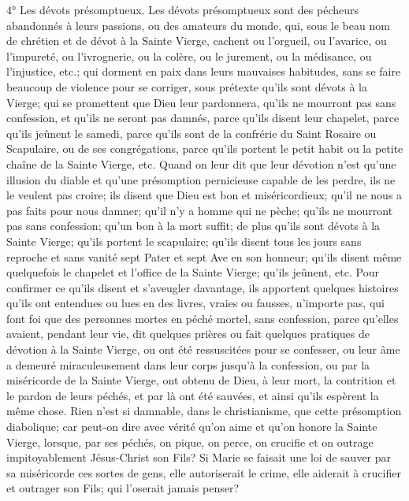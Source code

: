 4° Les dévots présomptueux.
 Les dévots présomptueux sont des pécheurs abandonnés à leurs passions, ou des amateurs du monde, qui,
sous le beau nom de chrétien et de dévot à la Sainte Vierge, cachent ou l'orgueil, ou l'avarice, ou l'impureté, ou
l'ivrognerie, ou la colère, ou le jurement, ou la médisance, ou l'injustice, etc.; qui dorment en paix dans leurs
mauvaises habitudes, sans se faire beaucoup de violence pour se corriger, sous prétexte qu'ils sont dévots à la
Vierge; qui se promettent que Dieu leur pardonnera, qu'ils ne mourront pas sans confession, et qu'ils ne seront pas
damnés, parce qu'ils disent leur chapelet, parce qu'ils jeûnent le samedi, parce qu'ils sont de la confrérie du Saint
Rosaire ou Scapulaire, ou de ses congrégations, parce qu'ils portent le petit habit ou la petite chaîne de la Sainte
Vierge, etc.
Quand on leur dit que leur dévotion n'est qu'une illusion du diable et qu'une présomption pernicieuse capable de
les perdre, ils ne le veulent pas croire; ils disent que Dieu est bon et miséricordieux; qu'il ne nous a pas faits pour
nous damner; qu'il n'y a homme qui ne pèche; qu'ils ne mourront pas sans confession; qu'un bon  à la mort
suffit; de plus qu'ils sont dévots à la Sainte Vierge; qu'ils portent le scapulaire; qu'ils disent tous les jours sans
reproche et sans vanité sept Pater et sept Ave en son honneur; qu'ils disent même quelquefois le chapelet et
l'office de la Sainte Vierge; qu'ils jeûnent, etc. Pour confirmer ce qu'ils disent et s'aveugler davantage, ils apportent
quelques histoires qu'ils ont entendues ou lues en des livres, vraies ou fausses, n'importe pas, qui font foi que des
personnes mortes en péché mortel, sans confession, parce qu'elles avaient, pendant leur vie, dit quelques prières
ou fait quelques pratiques de dévotion à la Sainte Vierge, ou ont été ressuscitées pour se confesser, ou leur âme a
demeuré miraculeusement dans leur corps jusqu'à la confession, ou par la miséricorde de la Sainte Vierge, ont
obtenu de Dieu, à leur mort, la contrition et le pardon de leurs péchés, et par là ont été sauvées, et ainsi qu'ils
espèrent la même chose.
 Rien n'est si damnable, dans le christianisme, que cette présomption diabolique; car peut-on dire avec vérité
qu'on aime et qu'on honore la Sainte Vierge, lorsque, par ses péchés, on pique, on perce, on crucifie et on outrage
impitoyablement Jésus-Christ son Fils? Si Marie se faisait une loi de sauver par sa miséricorde ces sortes de gens,
elle autoriserait le crime, elle aiderait à crucifier et outrager son Fils; qui l'oserait jamais penser?
